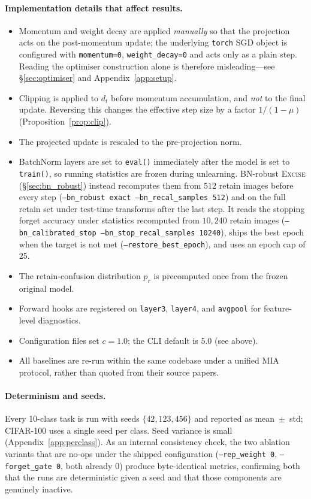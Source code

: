\documentclass{article}
\newcommand{\ours}{\textsc{Excise}}
\newcommand{\added}[1]{{\color{revised}#1}}
\theoremstyle{remark}
\theoremstyle{plain}
\begin{document}
\paragraph{Implementation details that affect results.}
\begin{itemize}
\item Momentum and weight decay are applied \emph{manually} so that the
projection acts on the post-momentum update; the underlying \texttt{torch} SGD
object is configured with \texttt{momentum=0}, \texttt{weight\_decay=0} and acts
only as a plain step. Reading the optimiser construction alone is therefore
misleading---see \S\ref{sec:optimiser} and Appendix~\ref{app:setup}.
\item Clipping is applied to $d_t$ before momentum accumulation, and \emph{not}
to the final update. Reversing this changes the effective step size by a factor
$1/(1-\mu)$ (Proposition~\ref{prop:clip}).
\item The projected update is rescaled to the pre-projection norm.
\item BatchNorm layers are set to \texttt{eval()} immediately after the model is
set to \texttt{train()}, so running statistics are frozen during unlearning.
\added{BN-robust \ours{} (\S\ref{sec:bn_robust}) instead recomputes them from
$512$ retain images before every step (\texttt{--bn\_robust exact
--bn\_recal\_samples 512}) and on the full retain set under test-time transforms
after the last step. It reads the stopping forget accuracy under statistics
recomputed from $10{,}240$ retain images (\texttt{--bn\_calibrated\_stop
--bn\_stop\_recal\_samples 10240}), ships the best epoch when the target is not
met (\texttt{--restore\_best\_epoch}), and uses an epoch cap of $25$.}
\item The retain-confusion distribution $p_r$ is precomputed once from the frozen
original model.
\item Forward hooks are registered on \texttt{layer3}, \texttt{layer4}, and
\texttt{avgpool} for feature-level diagnostics.
\item Configuration files set $c=1.0$; the CLI default is $5.0$ (see above).
\item All baselines are re-run within the same codebase under a unified MIA
protocol, rather than quoted from their source papers.
\end{itemize}

\paragraph{Determinism and seeds.}
Every 10-class task is run with seeds $\{42,123,456\}$ and reported as
mean~$\pm$~std; CIFAR-100 uses a single seed per class. Seed variance is small
(Appendix~\ref{app:perclass}). As an internal consistency check, the two
ablation variants that are no-ops under the shipped configuration
(\texttt{--rep\_weight 0}, \texttt{--forget\_gate 0}, both already $0$) produce
byte-identical metrics, confirming both that the runs are deterministic given a
seed and that those components are genuinely inactive.
\end{document}
